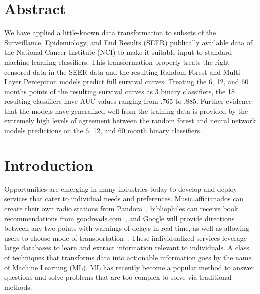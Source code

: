 \documentclass[10pt,letterpaper]{article}
\begin{document}
\section*{Abstract}
We have applied a little-known data transformation to subsets of the Surveillance, 
Epidemiology, and End Results (SEER) publically available data of the National Cancer 
Institute (NCI) to make it suitable input to standard machine learning classifiers. This transformation properly treats the right-censored data in the SEER data and the resulting Random Forest and Multi-Layer Perceptron models predict full survival curves. Treating the 6, 12, and 60 months points of the resulting survival curves as 3 binary classifiers, the 18 resulting classifiers have AUC values ranging from  .765 to .885. Further evidence that the models have generalized well from the training data is provided by the extremely high levels of agreement between the random forest and neural network models predictions on the 6, 12, and 60 month binary classifiers.



\linenumbers

\section*{Introduction}
\label{sec:introduction}



Opportunities are emerging in many industries today to develop and deploy services that cater to individual needs and preferences. Music afficianados can create their own radio stations from Pandora~\cite{pandora}, bibliophiles can receive 
book recommendations from goodreads.com~\cite{goodreads}, and Google will provide directions between any two points with warnings of delays in real-time, as well as allowing users to choose mode of transportation~\cite{maps}.
These individualized services leverage large databases to learn and extract information relevant to individuals.  
A class of techniques that transforms data into actionable information goes by the name of Machine Learning (ML)\cite{pythonmachinelearning}.
ML has recently become a popular method to answer questions and solve problems that are too complex to solve via traditional methods. 
\end{document}
